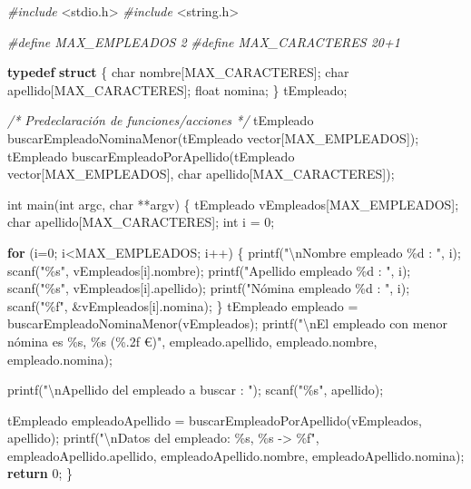 \documentclass[
]{book}
\newenvironment{Shaded}{\begin{snugshade}}{\end{snugshade}}
\newcommand{\CommentTok}[1]{\textcolor[rgb]{0.56,0.35,0.01}{\textit{#1}}}
\newcommand{\ControlFlowTok}[1]{\textcolor[rgb]{0.13,0.29,0.53}{\textbf{#1}}}
\newcommand{\DataTypeTok}[1]{\textcolor[rgb]{0.13,0.29,0.53}{#1}}
\newcommand{\DecValTok}[1]{\textcolor[rgb]{0.00,0.00,0.81}{#1}}
\newcommand{\ImportTok}[1]{#1}
\newcommand{\KeywordTok}[1]{\textcolor[rgb]{0.13,0.29,0.53}{\textbf{#1}}}
\newcommand{\NormalTok}[1]{#1}
\newcommand{\PreprocessorTok}[1]{\textcolor[rgb]{0.56,0.35,0.01}{\textit{#1}}}
\newcommand{\SpecialCharTok}[1]{\textcolor[rgb]{0.00,0.00,0.00}{#1}}
\newcommand{\StringTok}[1]{\textcolor[rgb]{0.31,0.60,0.02}{#1}}
\begin{document}
\begin{Shaded}
\begin{Highlighting}[]
\PreprocessorTok{\#include }\ImportTok{\textless{}stdio.h\textgreater{}}
\PreprocessorTok{\#include }\ImportTok{\textless{}string.h\textgreater{}}

\PreprocessorTok{\#define MAX\_EMPLEADOS 2}
\PreprocessorTok{\#define MAX\_CARACTERES 20+1}

\KeywordTok{typedef} \KeywordTok{struct}\NormalTok{ \{}
    \DataTypeTok{char}\NormalTok{ nombre[MAX\_CARACTERES];}
    \DataTypeTok{char}\NormalTok{ apellido[MAX\_CARACTERES];}
    \DataTypeTok{float}\NormalTok{ nomina;}
\NormalTok{\} tEmpleado;}

\CommentTok{/* Predeclaración de funciones/acciones */}
\NormalTok{tEmpleado buscarEmpleadoNominaMenor(tEmpleado vector[MAX\_EMPLEADOS]);}
\NormalTok{tEmpleado buscarEmpleadoPorApellido(tEmpleado vector[MAX\_EMPLEADOS], }\DataTypeTok{char}\NormalTok{ apellido[MAX\_CARACTERES]);}

\DataTypeTok{int}\NormalTok{ main(}\DataTypeTok{int}\NormalTok{ argc, }\DataTypeTok{char}\NormalTok{ **argv) \{}
\NormalTok{    tEmpleado vEmpleados[MAX\_EMPLEADOS];}
    \DataTypeTok{char}\NormalTok{ apellido[MAX\_CARACTERES];}
    \DataTypeTok{int}\NormalTok{ i = }\DecValTok{0}\NormalTok{;}

    \ControlFlowTok{for}\NormalTok{ (i=}\DecValTok{0}\NormalTok{; i\textless{}MAX\_EMPLEADOS; i++) \{}
\NormalTok{        printf(}\StringTok{"}\SpecialCharTok{\textbackslash{}n}\StringTok{Nombre empleado \%d : "}\NormalTok{, i);}
\NormalTok{        scanf(}\StringTok{"\%s"}\NormalTok{, vEmpleados[i].nombre);}
\NormalTok{        printf(}\StringTok{"Apellido empleado \%d : "}\NormalTok{, i);}
\NormalTok{        scanf(}\StringTok{"\%s"}\NormalTok{, vEmpleados[i].apellido);}
\NormalTok{        printf(}\StringTok{"Nómina empleado \%d : "}\NormalTok{, i);}
\NormalTok{        scanf(}\StringTok{"\%f"}\NormalTok{, \&vEmpleados[i].nomina);}
\NormalTok{    \}}
\NormalTok{    tEmpleado empleado = buscarEmpleadoNominaMenor(vEmpleados);}
\NormalTok{    printf(}\StringTok{"}\SpecialCharTok{\textbackslash{}n}\StringTok{El empleado con menor nómina es \%s, \%s (\%.2f €)"}\NormalTok{, empleado.apellido, empleado.nombre, empleado.nomina);}

\NormalTok{    printf(}\StringTok{"}\SpecialCharTok{\textbackslash{}n}\StringTok{Apellido del empleado a buscar : "}\NormalTok{);}
\NormalTok{    scanf(}\StringTok{"\%s"}\NormalTok{, apellido);}

\NormalTok{    tEmpleado empleadoApellido = buscarEmpleadoPorApellido(vEmpleados, apellido);}
\NormalTok{    printf(}\StringTok{"}\SpecialCharTok{\textbackslash{}n}\StringTok{Datos del empleado: \%s, \%s {-}\textgreater{} \%f"}\NormalTok{, empleadoApellido.apellido, empleadoApellido.nombre, empleadoApellido.nomina);}
    \ControlFlowTok{return} \DecValTok{0}\NormalTok{;}
\NormalTok{\}}


\end{Highlighting}
\end{Shaded}
\end{document}
